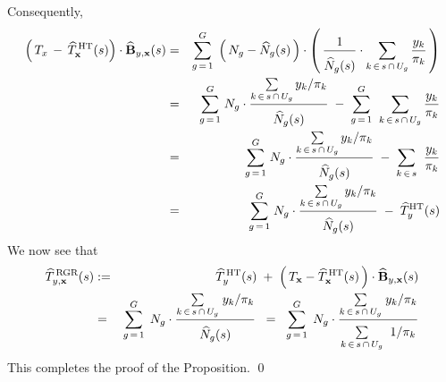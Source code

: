 Consequently,
\begin{eqnarray*}
\left(\,T_{x} \,-\, \widehat{T}^{\,\textnormal{HT}}_{\mathbf{x}}(s)\right)
\cdot
\widehat{\mathbf{B}}_{y,\mathbf{x}}(s)
& = &
	\overset{G}{\underset{g\,=\,1}{\sum}}\;
	\left(\,N_{g} - \widehat{N}_{g}(s) \,\right)
	\cdot
	\left(\,
		\dfrac{1}{\overset{{\color{white}.}}{\widehat{N}_{g}(s)}}
		\cdot
		\underset{k\,\in\,s\,\cap\,U_{g}}{\sum}\, \dfrac{y_{k}}{\pi_{k}}
	\,\right)
\\
& = &
	\overset{G}{\underset{g\,=\,1}{\sum}}\;
	N_{g} \cdot \dfrac{ \underset{k\,\in\,s\,\cap\,U_{g}}{\sum}\, y_{k}/\pi_{k} }{\overset{{\color{white}.}}{\widehat{N}_{g}(s)}}
	\; - \;
	\overset{G}{\underset{g\,=\,1}{\sum}}\;\;
	\underset{k\,\in\,s\,\cap\,U_{g}}{\sum}\, \dfrac{y_{k}}{\pi_{k}}
\\
& = &
	\overset{G}{\underset{g\,=\,1}{\sum}}\;
	N_{g} \cdot \dfrac{ \underset{k\,\in\,s\,\cap\,U_{g}}{\sum}\, y_{k}/\pi_{k} }{\overset{{\color{white}.}}{\widehat{N}_{g}(s)}}
	\; - \;
	\underset{k\,\in\,s}{\sum}\;\;\dfrac{y_{k}}{\pi_{k}}
\\
& = &
	\overset{G}{\underset{g\,=\,1}{\sum}}\;
	N_{g} \cdot \dfrac{ \underset{k\,\in\,s\,\cap\,U_{g}}{\sum}\, y_{k}/\pi_{k} }{\overset{{\color{white}.}}{\widehat{N}_{g}(s)}}
	\; - \;
	\widehat{T}^{\textnormal{HT}}_{y}(s)
\end{eqnarray*}
We now see that
\begin{eqnarray*}
\widehat{T}^{\,\textnormal{RGR}}_{y,\mathbf{x}}(s)
& := &
	\widehat{T}^{\,\textnormal{HT}}_{y}(s)
	\; + \;
	\left(\,T_{\mathbf{x}} - \widehat{T}^{\,\textnormal{HT}}_{\mathbf{x}}(s) \,\right)
	\cdot
	\widehat{\mathbf{B}}_{y,\mathbf{x}}(s)
\\
& = &
	\overset{G}{\underset{g\,=\,1}{\sum}}\;\, N_{g}
	\cdot
	\dfrac{
		\underset{k\,\in\,s\,\cap\,U_{g}}{\sum}\;y_{k}/\pi_{k}
		}{
		\overset{{\color{white}.}}{\widehat{N}_{g}(s)}
		}
\;\; = \;\;
	\overset{G}{\underset{g\,=\,1}{\sum}}\;\, N_{g}
	\cdot
	\dfrac{
		\underset{k\,\in\,s\,\cap\,U_{g}}{\sum}\;y_{k}/\pi_{k}
		}{
		\underset{k\,\in\,s\,\cap\,U_{g}}{\overset{{\color{white}.}}{\sum}}\;\;1/\pi_{k}
		}
\end{eqnarray*}
This completes the proof of the Proposition.
\qed


\renewcommand{\theenumi}{\roman{enumi}}
\renewcommand{\labelenumi}{\textnormal{(\theenumi)}$\;\;$}

